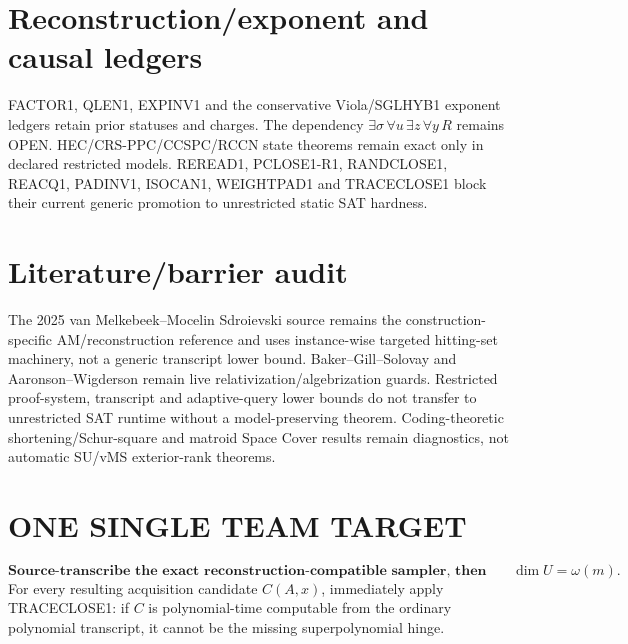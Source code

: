 \documentclass[11pt]{article}\usepackage[margin=.86in]{geometry}\usepackage{amsmath,amssymb}
\begin{document}
\section*{Reconstruction/exponent and causal ledgers}
FACTOR1, QLEN1, EXPINV1 and the conservative Viola/SGLHYB1 exponent ledgers retain prior statuses and charges. The dependency \(\exists\sigma\,\forall u\,\exists z\,\forall y\,R\) remains OPEN. HEC/CRS-PPC/CCSPC/RCCN state theorems remain exact only in declared restricted models. REREAD1, PCLOSE1-R1, RANDCLOSE1, REACQ1, PADINV1, ISOCAN1, WEIGHTPAD1 and TRACECLOSE1 block their current generic promotion to unrestricted static SAT hardness.

\section*{Literature/barrier audit}
The 2025 van Melkebeek--Mocelin Sdroievski source remains the construction-specific AM/reconstruction reference and uses instance-wise targeted hitting-set machinery, not a generic transcript lower bound. Baker--Gill--Solovay and Aaronson--Wigderson remain live relativization/algebrization guards. Restricted proof-system, transcript and adaptive-query lower bounds do not transfer to unrestricted SAT runtime without a model-preserving theorem. Coding-theoretic shortening/Schur-square and matroid Space Cover results remain diagnostics, not automatic SU/vMS exterior-rank theorems.

\section*{ONE SINGLE TEAM TARGET}
\[
\boxed{\textbf{Source-transcribe the exact reconstruction-compatible sampler, then prove or falsify the three-parameter shortening/innovation lemma yielding }\dim U=\omega(m).}
\]
For every resulting acquisition candidate \(C(A,x)\), immediately apply TRACECLOSE1: if \(C\) is polynomial-time computable from the ordinary polynomial transcript, it cannot be the missing superpolynomial hinge.
\end{document}
